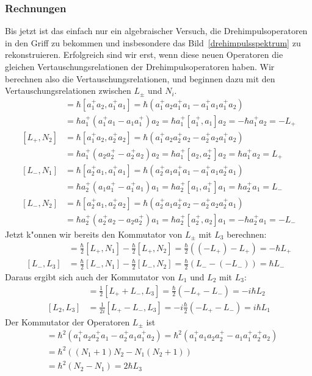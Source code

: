 \subsubsection{Rechnungen}
Bis jetzt ist das einfach nur ein algebraischer Versuch, die
Drehimpulsoperatoren in den Griff zu bekommen und insbesondere
das Bild~\ref{drehimpulsspektrum} zu rekonstruieren.
Erfolgreich sind wir erst, wenn diese neuen Operatoren die gleichen
Vertauschungsrelationen der Drehimpulsoperatoren haben.
Wir berechnen also die Vertauschungsrelationen, und beginnen dazu mit
den Vertauschungsrelationen zwischen $L_\pm$ und $N_i$.
\begin{align*}
[L_+,N_1]
&=
\hbar[a_1^+a_2,a_1^+a_1]
=
\hbar( a_1^+a_2 a_1^+a_1 - a_1^+a_1 a_1^+a_2)
\\
&=
\hbar a_1^+( a_1^+a_1 - a_1 a_1^+)a_2
=
\hbar a_1^+[ a_1^+,a_1]a_2
=
-\hbar a_1^+a_2
=-L_+
\\
[L_+,N_2]
&=
\hbar[a_1^+a_2,a_2^+a_2]
=
\hbar( a_1^+a_2 a_2^+a_2 - a_2^+a_2 a_1^+a_2)
\\
&=
\hbar a_1^+( a_2 a_2^+ - a_2^+a_2)a_2
=
\hbar a_1^+[a_2,a_2^+]a_2
=
\hbar a_1^+a_2
=
L_+
\\
[L_-,N_1]
&=
\hbar[a_2^+a_1,a_1^+a_1]
=
\hbar( a_2^+a_1 a_1^+a_1 - a_1^+a_1 a_2^+a_1)
\\
&=
\hbar a_2^+(a_1 a_1^+ - a_1^+a_1)a_1
=
\hbar a_2^+[a_1,a_1^+]a_1
=
\hbar a_2^+a_1
=
L_-
\\
[L_-,N_2]
&=
\hbar[a_2^+a_1,a_2^+a_2]
=
\hbar( a_2^+a_1 a_2^+a_2 - a_2^+a_2 a_2^+a_1)
\\
&=
\hbar a_2^+(a_2^+a_2 - a_2 a_2^+) a_1
=
\hbar a_2^+[a_2^+,a_2] a_1
=
-\hbar a_2^+a_1
=-L_-
\end{align*}
Jetzt k"onnen wir bereits den Kommutator von $L_\pm$ mit $L_3$
berechnen:
\begin{align*}
[L_+,L_3]
&=
\frac{\hbar}2[L_+,N_1]
-
\frac{\hbar}2[L_+,N_2]
=
\frac{\hbar}2((-L_+)-L_+)=-\hbar L_+
\\
[L_-,L_3]
&=
\frac{\hbar}2[L_-,N_1]
-
\frac{\hbar}2[L_-,N_2]
=
\frac{\hbar}2(L_--(-L_-))
=\hbar L_-
\end{align*}
Daraus ergibt sich auch der Kommutator von $L_1$ und $L_2$ mit $L_3$:
\begin{align*}
[L_1,L_3]
&=
\frac12[L_++L_-,L_3]
=
\frac{\hbar}2(-L_+-L_-)
=
-i\hbar L_2
\\
[L_2,L_3]
&=
\frac1{2i}[L_+-L_-,L_3]
=
-i\frac{\hbar}{2}(-L_+-L_-)
=
i\hbar L_1
\end{align*}
Der Kommutator der Operatoren $L_\pm$ ist
\begin{align*}
[L_+,L_-]
&=
\hbar^2(a_1^+a_2a_2^+a_1-a_2^+a_1a_1^+a_2)
=
\hbar^2(
a_1^+
a_1
a_2
a_2^+
-
a_1
a_1^+
a_2^+
a_2
)
\\
&=
\hbar^2
(
(N_1+1)N_2
-
N_1(N_2+1)
)
\\
&=
\hbar^2
(
N_2
-
N_1
)
=2\hbar L_3
\end{align*}
